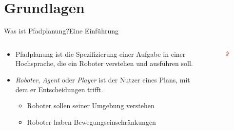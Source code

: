 \documentclass[t,aspectratio=169,dvipsnames]{beamer}
\begin{document}
\section{Grundlagen}

\begin{frame}{Was ist Pfadplanung?}{Eine Einführung}
	\begin{columns}[T]
		\begin{column}[T]{0.6\textwidth}
		\begin{itemize}
		\item Pfadplanung ist die Spezifizierung einer Aufgabe in einer Hochsprache, die ein Roboter verstehen und ausführen soll.
		\newline\newline
		\item \textit{Roboter}, \textit{Agent} oder \textit{Player} ist der Nutzer eines Plans, mit dem er Entscheidungen trifft.
	
		\begin{itemize}
		\item Roboter sollen seiner Umgebung verstehen
		\item Roboter haben Bewegungseinschränkungen
		\end{itemize}
		\end{itemize}
		\end{column}
		\begin{column}[T]{0.4\textwidth}
			\begin{figure}
			\includegraphics[width=2.5cm]{images/Bild1.png}
		\end{figure}
		\end{column}
	\end{columns}
\end{frame}
\end{document}

